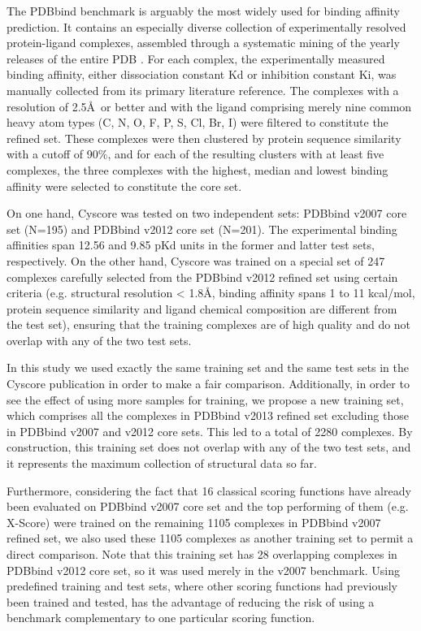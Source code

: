 \documentclass[journal=jacsat,manuscript=article]{achemso}
\begin{document}
The PDBbind benchmark is arguably the most widely used for binding affinity prediction. It contains an especially diverse collection of experimentally resolved protein-ligand complexes, assembled through a systematic mining of the yearly releases of the entire PDB \cite{540,537}. For each complex, the experimentally measured binding affinity, either dissociation constant Kd or inhibition constant Ki, was manually collected from its primary literature reference. The complexes with a resolution of 2.5\AA\ or better and with the ligand comprising merely nine common heavy atom types (C, N, O, F, P, S, Cl, Br, I) were filtered to constitute the refined set. These complexes were then clustered by protein sequence similarity with a cutoff of 90\%, and for each of the resulting clusters with at least five complexes, the three complexes with the highest, median and lowest binding affinity were selected to constitute the core set.

On one hand, Cyscore was tested on two independent sets: PDBbind v2007 core set (N=195) and PDBbind v2012 core set (N=201). The experimental binding affinities span 12.56 and 9.85 pKd units in the former and latter test sets, respectively. On the other hand, Cyscore was trained on a special set of 247 complexes carefully selected from the PDBbind v2012 refined set using certain criteria \cite{1372} (e.g. structural resolution < 1.8\AA, binding affinity spans 1 to 11 kcal/mol, protein sequence similarity and ligand chemical composition are different from the test set), ensuring that the training complexes are of high quality and do not overlap with any of the two test sets.

In this study we used exactly the same training set and the same test sets in the Cyscore publication in order to make a fair comparison. Additionally, in order to see the effect of using more samples for training, we propose a new training set, which comprises all the complexes in PDBbind v2013 refined set excluding those in PDBbind v2007 and v2012 core sets. This led to a total of 2280 complexes. By construction, this training set does not overlap with any of the two test sets, and it represents the maximum collection of structural data so far. %

Furthermore, considering the fact that 16 classical scoring functions have already been evaluated \cite{1313} on PDBbind v2007 core set and the top performing of them (e.g. X-Score) were trained on the remaining 1105 complexes in PDBbind v2007 refined set, we also used these 1105 complexes as another training set to permit a direct comparison. Note that this training set has 28 overlapping complexes in PDBbind v2012 core set, so it was used merely in the v2007 benchmark. Using predefined training and test sets, where other scoring functions had previously been trained and tested, has the advantage of reducing the risk of using a benchmark complementary to one particular scoring function.
\end{document}
